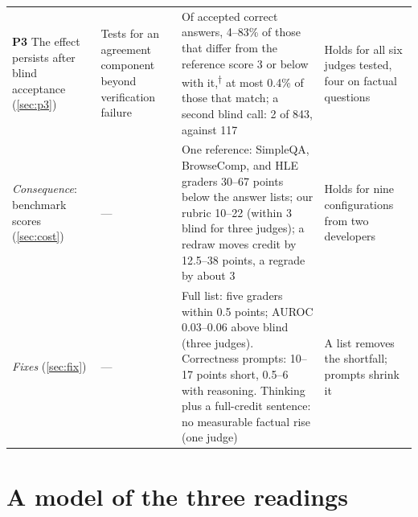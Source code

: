 \documentclass{article}
\newcommand{\ph}{\textsuperscript{$\dagger$}}
\begin{document}
\begin{table}[t]
\begin{tabular}{L{2.65cm}L{2.15cm}L{5.7cm}L{2.4cm}}
\addlinespace[2pt]
\textbf{P3} The effect persists after blind acceptance (\cref{sec:p3}) & Tests for an agreement component beyond verification failure & Of accepted correct answers, 4--83\% of those that differ from the reference score 3 or below with it,\ph{} at most 0.4\% of those that match; a second blind call: 2 of 843, against 117 & Holds for all six judges tested, four on factual questions \\
\addlinespace[2pt]
\emph{Consequence}: benchmark scores (\cref{sec:cost}) & --- & One reference: SimpleQA, BrowseComp, and HLE graders 30--67 points below the answer lists; our rubric 10--22 (within 3 blind for three judges); a redraw moves credit by 12.5--38 points, a regrade by about 3 & Holds for nine configurations from two developers \\
\addlinespace[2pt]
\emph{Fixes} (\cref{sec:fix}) & --- & Full list: five graders within 0.5 points; AUROC 0.03--0.06 above blind (three judges). Correctness prompts: 10--17 points short, 0.5--6 with reasoning. Thinking plus a full-credit sentence: no measurable factual rise (one judge) & A list removes the shortfall; prompts shrink it \\
\bottomrule
\end{tabular}
\end{table}

\section{A model of the three readings}
\label{sec:model}
\end{document}
